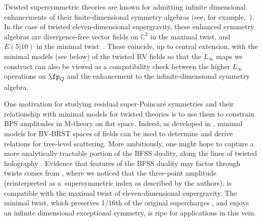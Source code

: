 \documentclass[pdftex]{sigma}
\numberwithin{equation}{section}
\theoremstyle{definition}
\def\C{\mathbb{C}}
\begin{document}
Twisted supersymmetric theories are known for admitting infinite dimensional enhancements of their finite-dimensional symmetry algebras (see, for example,~\cite{Beem:2013sza, Garner:2023wrc, SCA}). In the case of twisted eleven-dimensional supergravity, these enhanced symmetry algebras are divergence-free vector fields on $\C^2$ in the maximal twist, and $E(5|10)$ in the minimal twist~\cite{LSCA, RSW}. These coincide, up to central extension, with the minimal models (see below) of the twisted BV fields so that the $L_\infty$ maps we construct can also be viewed as a compatibility check between the higher $L_\infty$ operations on $\fp_Q$ and the enhancement to the infinite-dimensional symmetry algebra.

One motivation for studying residual super-Poincar\'e symmetries and their relationship with minimal models for twisted theories is to use them to constrain BPS amplitudes in M-theory on flat space. Indeed, as developed in \cite{perturbiner,Scattering-recursion}, minimal models for BV-BRST spaces of fields can be used to determine and derive relations for tree-level scattering. More ambitiously, one might hope to capture a more analytically tractable portion of the BFSS duality, along the lines of twisted holography \cite{ Costello:2018zrm,CostelloLi, Costello:2020jbh}. Evidence that features of the BFSS duality may factor through twists comes from \cite{MaldacenaHerderschee}, where we noticed that the three-point amplitude (reinterpreted as a~supersymmetric index as described by the authors), is compatible with the maximal twist of eleven-dimensional supergravity. The minimal twist, which preserves 1/16th of the original supercharges \cite{RSW}, and enjoys an infinite dimensional exceptional symmetry, is ripe for applications in this vein.
\end{document}
